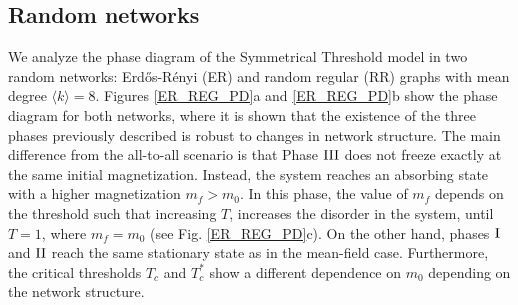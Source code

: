 \subsection{Random networks}

We analyze the phase diagram of the Symmetrical Threshold model in two random networks: Erd\H{o}s-Rényi (ER) \cite{erdos1960evolution} and random regular (RR) \cite{wormald1999models} graphs with mean degree $\langle k \rangle = 8$. Figures \ref{ER_REG_PD}a and \ref{ER_REG_PD}b show the phase diagram for both networks, where it is shown that the existence of the three phases previously described is robust to changes in network structure. The main difference from the all-to-all scenario is that Phase ${\rm III}$ does not freeze exactly at the same initial magnetization. Instead, the system reaches an absorbing state with a higher magnetization $m_f > m_0$. In this phase, the value of $m_f$ depends on the threshold such that increasing $T$, increases the disorder in the system, until $T = 1$, where $m_f = m_0$ (see Fig. \ref{ER_REG_PD}c). On the other hand, phases ${\rm I}$ and ${\rm II}$ reach the same stationary state as in the mean-field case. Furthermore, the critical thresholds $T_{c}$ and $T_{c}^{*}$ show a different dependence on $m_0$ depending on the network structure.
